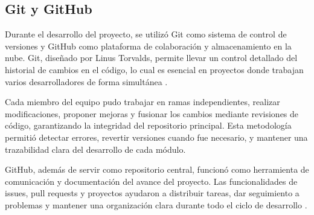 \subsection{Git y GitHub}

\begin{list}{}%
	{\setlength{\leftmargin}{1cm}\setlength{\rightmargin}{1cm}}
	\item\relax
	\small
	
	Durante el desarrollo del proyecto, se utilizó Git como sistema de control de versiones y GitHub como plataforma de colaboración y almacenamiento en la nube. Git, diseñado por Linus Torvalds, permite llevar un control detallado del historial de cambios en el código, lo cual es esencial en proyectos donde trabajan varios desarrolladores de forma simultánea \cite{CitaD20}.
	
	Cada miembro del equipo pudo trabajar en ramas independientes, realizar modificaciones, proponer mejoras y fusionar los cambios mediante revisiones de código, garantizando la integridad del repositorio principal. Esta metodología permitió detectar errores, revertir versiones cuando fue necesario, y mantener una trazabilidad clara del desarrollo de cada módulo.
	
	GitHub, además de servir como repositorio central, funcionó como herramienta de comunicación y documentación del avance del proyecto. Las funcionalidades de issues, pull requests y proyectos ayudaron a distribuir tareas, dar seguimiento a problemas y mantener una organización clara durante todo el ciclo de desarrollo \cite{CitaD21}.
	
\end{list}


